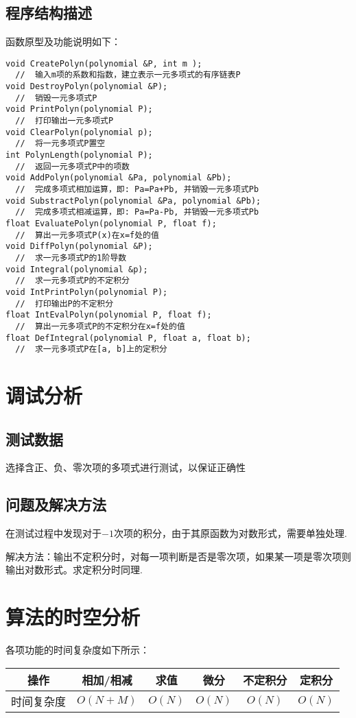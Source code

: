 \documentclass[UTF8]{ctexart}
\begin{document}
\subsection{程序结构描述}
函数原型及功能说明如下：
\begin{lstlisting}
void CreatePolyn(polynomial &P, int m );
  //  输入m项的系数和指数，建立表示一元多项式的有序链表P
void DestroyPolyn(polynomial &P);
  //  销毁一元多项式P
void PrintPolyn(polynomial P);
  //  打印输出一元多项式P
void ClearPolyn(polynomial p);
  //  将一元多项式P置空
int PolynLength(polynomial P);
  //  返回一元多项式P中的项数
void AddPolyn(polynomial &Pa, polynomial &Pb);
  //  完成多项式相加运算，即: Pa=Pa+Pb, 并销毁一元多项式Pb
void SubstractPolyn(polynomial &Pa, polynomial &Pb);
  //  完成多项式相减运算，即: Pa=Pa-Pb, 并销毁一元多项式Pb
float EvaluatePolyn(polynomial P, float f);
  //  算出一元多项式P(x)在x=f处的值
void DiffPolyn(polynomial &P);
  //  求一元多项式P的1阶导数
void Integral(polynomial &p);
  //  求一元多项式P的不定积分
void IntPrintPolyn(polynomial P);
  //  打印输出P的不定积分
float IntEvalPolyn(polynomial P, float f);
  //  算出一元多项式P的不定积分在x=f处的值
float DefIntegral(polynomial P, float a, float b);
  //  求一元多项式P在[a, b]上的定积分
\end{lstlisting}
\section{调试分析}
\subsection{测试数据}
选择含正、负、零次项的多项式进行测试，以保证正确性
\subsection{问题及解决方法}
在测试过程中发现对于$-1$次项的积分，由于其原函数为对数形式，需要单独处理.

解决方法：输出不定积分时，对每一项判断是否是零次项，如果某一项是零次项则输出对数形式。求定积分时同理.
\section{算法的时空分析}
各项功能的时间复杂度如下所示：
\begin{table}[H]
  \centering
  \begin{tabular}{cccccc}
    \hline\hline
    操作 & 相加/相减 & 求值 & 微分 & 不定积分 & 定积分 \\
    \hline
    时间复杂度 & $O(N+M)$ & $O(N)$ & $O(N)$ & $O(N)$ & $O(N)$ \\
    \hline
  \end{tabular}
\end{table}
\end{document}
